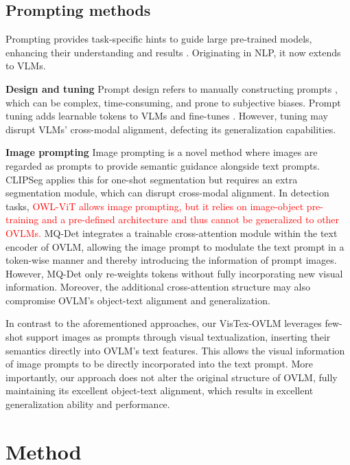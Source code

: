 \documentclass[10pt,twocolumn,letterpaper]{article}
\begin{document}
\subsection{Prompting methods}

Prompting provides task-specific hints to guide large pre-trained models, enhancing their understanding and results \cite{gu2023systematic}. Originating in NLP, it now extends to VLMs.

\textbf{Design and tuning} Prompt design refers to manually constructing prompts \cite{efrat2020turking, radford2019language}, which can be complex, time-consuming, and prone to subjective biases. Prompt tuning adds learnable tokens to VLMs and fine-tunes \cite{bahng2022vp, chowdhury2023apollo, jia2022vpt, khattak2023pt, zhou2022cocoop, zhou2022coop}. However, tuning may disrupt VLMs' cross-modal alignment, defecting its generalization capabilities.

\textbf{Image prompting} Image prompting is a novel method where images are regarded as prompts to provide semantic guidance alongside text prompts. CLIPSeg \cite{luddecke2022clipseg} applies this for one-shot segmentation but requires an extra segmentation module, which can disrupt cross-modal alignment. In detection tasks, \textcolor{red}{OWL-ViT \cite{minderer2022simple} allows image prompting, but it relies on image-object pre-training and a pre-defined architecture and thus cannot be generalized to other OVLMs.} MQ-Det \cite{xu2023mqdet} integrates a trainable cross-attention module within the text encoder of OVLM, allowing the image prompt to modulate the text prompt in a token-wise manner and thereby introducing the information of prompt images. However, MQ-Det only re-weights tokens without fully incorporating new visual information. Moreover, the additional cross-attention structure may also compromise OVLM’s object-text alignment and generalization.

In contrast to the aforementioned approaches, our VisTex-OVLM leverages few-shot support images as prompts through visual textualization, inserting their semantics directly into OVLM’s text features. This allows the visual information of image prompts to be directly incorporated into the text prompt. More importantly, our approach does not alter the original structure of OVLM, fully maintaining its excellent object-text alignment, which results in excellent generalization ability and performance. 

\section{Method}
\end{document}
